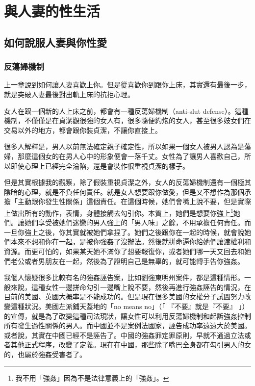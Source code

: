 \chapter{與人妻的性生活}

\section{如何說服人妻與你性愛}

\subsection{反蕩婦機制}

上一章說到如何讓人妻喜歡上你。但是從喜歡你到跟你上床，其實還有最後一步，就是突破人妻最後對出軌上床的抗拒心理。

女人在跟一個新的人上床之前，都會有一種反蕩婦機制（anti-slut defense）。這種機制，不僅僅是在貞潔觀很強的女人有，很多隨便約炮的女人，甚至很多妓女們在交易以外的地方，都會跟你裝貞潔，不讓你直接上。

很多人解釋是，男人以前無法確定親子確定性，所以如果一個女人被男人認為是蕩婦，那麼這個女的在男人心中的形象便會一落千丈。女性為了讓男人喜歡自己，所以即使心理上已經完全淪陷，還是會裝作很重視貞潔的樣子。

但是其實根據我的觀察，除了假裝重視貞潔之外，女人的反蕩婦機制還有一個極其陰暗的心理，就是不負任何責任。就是女人想要跟你做愛，但是又不想作為那個承擔「主動跟你發生性關係」這個責任。在這個時候，她們會嘴上說不要，但是實際上做出所有的動作，表情，身體接觸去勾引你。本質上，她們是想要你強上\footnote{我不用「強姦」因為不是法律意義上的「強姦」。}她們。讓她們享受被她們迷戀的男人強上的「男人味」之餘，不用承擔任何責任。而一旦你強上之後，你其實就被她們拿捏了。她們之後跟你在一起的時候，就會說她們本來不想和你在一起，是被你強姦了沒辦法。然後就拼命逼你給她們讓渡權利和資源。而更可怕的，如果某天她不滿你了想要報復你，或者她們哪一天又回去和她們老公或者男朋友在一起，然後為了證明自己是無辜的，就可能轉手告你強姦。

我個人懷疑很多比較有名的強姦誣告案，比如劉強東明州案件，都是這種情形。一般來說，這種女性一邊拼命勾引一邊嘴上說不要，然後再進行強姦誣告的情況，在目前的美國、英國大概率是不能成功的。但是現在很多美國的女權分子試圖努力改變這種狀況。美國左派鋪天蓋地的「no means no」（「 『不要』就是『不要』 」）的宣傳，就是為了改變這種司法現狀，讓女性可以利用反蕩婦機制和起訴強姦控制所有發生過性關係的男人。而中國並不是案例法國家，誣告成功率遠遠大於美國。或者說，其實在中國已經不是誣告了。中國的強姦罪定罪原則，早就不通過立法或者其他正式程序，改變了定義。現在在中國，那些除了嘴巴全身都在勾引男人的女的，也屬於強姦受害者了。

